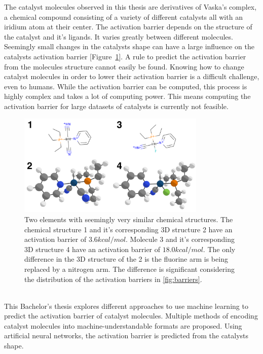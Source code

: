 The catalyst molecules observed in this thesis are derivatives of Vaska's complex, a chemical compound consisting of a variety of different catalysts all with an iridium atom at their center.
The activation barrier depends on the structure of the catalyst and it's ligands.
It varies greatly between different molecules.
Seemingly small changes in the catalysts shape can have a large influence on the catalysts activation barrier [Figure~\ref{fig:struct-diff}].
A rule to predict the activation barrier from the molecules structure cannot easily be found.  
Knowing how to change catalyst molecules in order to lower their activation barrier is a difficult challenge, even to humans.
While the activation barrier can be computed, this process is highly complex and takes a lot of computing power.
This means computing the activation barrier for large datasets of catalysts is currently not feasible.
\begin{figure}[hb!]
  \centering
  \includegraphics[width=0.8\textwidth]{figures/introduction/elems_intro.png}
  \caption[Example of catalyst molecules]{Two elements with seemingly very similar chemical structures. The chemical structure 1 and it's corresponding 3D structure 2 have an activation barrier of $3.6 kcal/mol$.
  Molecule 3 and it's corresponding 3D structure 4 have an activation barrier of $18.0 kcal/mol$.
  The only difference in the 3D structure of the 2 is the fluorine arm is being replaced by a nitrogen arm.
  The difference is significant considering the distribution of the activation barriers in \ref{fig:barriers}.  }
  \label{fig:struct-diff}
\end{figure}
\\
This Bachelor's thesis explores different approaches to use machine learning to predict the activation barrier of catalyst molecules.
Multiple methods of encoding catalyst molecules into machine-understandable formats are proposed.
Using artificial neural networks, the activation barrier is predicted from the catalysts shape.

